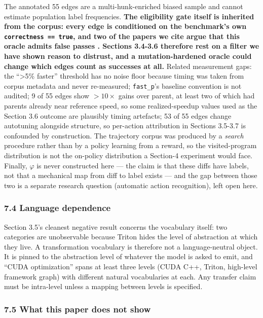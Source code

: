 \documentclass[
  11pt,
]{article}
\begin{document}
The annotated 55 edges are a multi-hunk-enriched biased sample and cannot estimate population label frequencies. \textbf{The eligibility gate itself is inherited from the corpus: every edge is conditioned on the benchmark's own \texttt{correctness\ ==\ true}, and two of the papers we cite argue that this oracle admits false passes \cite{the20,measuring24}. Sections 3.4-3.6 therefore rest on a filter we have shown reason to distrust, and a mutation-hardened oracle could change which edges count as successes at all.} Related measurement gaps: the ``\textgreater5\% faster'' threshold has no noise floor because timing was taken from corpus metadata and never re-measured; \texttt{fast\_p}'s baseline convention is not audited; 9 of 55 edges show \(> 10\times\) gains over parent, at least two of which had parents already near reference speed, so some realized-speedup values used as the Section 3.6 outcome are plausibly timing artefacts; 53 of 55 edges change autotuning alongside structure, so per-action attribution in Sections 3.5-3.7 is confounded by construction. The trajectory corpus was produced by a \emph{search} procedure rather than by a policy learning from a reward, so the visited-program distribution is not the on-policy distribution a Section-4 experiment would face. Finally, \(\varphi\) is never constructed here --- the claim is that these diffs have labels, not that a mechanical map from diff to label exists --- and the gap between those two is a separate research question (automatic action recognition), left open here.

\hypertarget{language-dependence}{%
\subsubsection{7.4 Language dependence}\label{language-dependence}}

Section 3.5's cleanest negative result concerns the vocabulary itself: two categories are unobservable because Triton hides the level of abstraction at which they live. A transformation vocabulary is therefore not a language-neutral object. It is pinned to the abstraction level of whatever the model is asked to emit, and ``CUDA optimization'' spans at least three levels (CUDA C++, Triton, high-level framework graph) with different natural vocabularies at each. Any transfer claim must be intra-level unless a mapping between levels is specified.

\hypertarget{what-this-paper-does-not-show}{%
\subsubsection{7.5 What this paper does not show}\label{what-this-paper-does-not-show}}
\end{document}

